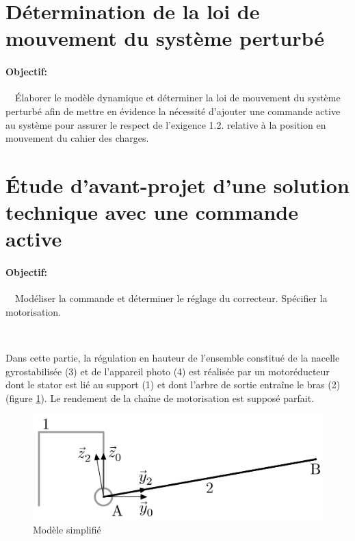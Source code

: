 \section{Détermination de la loi de mouvement du système perturbé}

\paragraph{Objectif:} ~\ Élaborer le modèle dynamique et déterminer la loi de mouvement du système perturbé afin de mettre en évidence la nécessité d'ajouter une commande active au système pour assurer le respect de l'exigence 1.2. relative à la position en mouvement du cahier des charges.



\section{Étude d’avant-projet d’une solution technique avec une commande active}

\paragraph{Objectif:} ~\ Modéliser la commande et déterminer le réglage du correcteur. Spécifier la motorisation.

~\

Dans cette partie, la régulation en hauteur de l’ensemble constitué de la nacelle gyrostabilisée (3) et de l’appareil photo (4) est réalisée par un motoréducteur dont le stator est lié au support (1) et dont l’arbre de sortie entraîne le bras (2) (figure \ref{fig10}). Le rendement de la chaîne de motorisation est supposé parfait.

\begin{figure}[ht!]
\begin{center}
 \includegraphics[width=0.5\linewidth]{img/fig10}
\end{center}
\caption{Modèle simplifié}
\label{fig10}
\end{figure}

